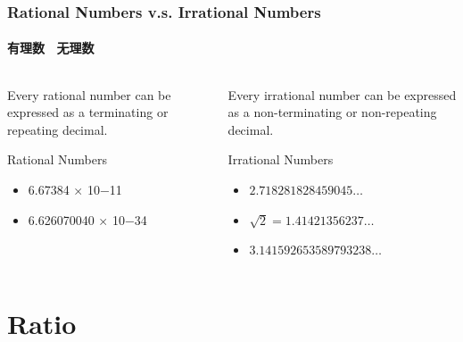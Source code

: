 \documentclass[
	11pt, %
]{beamer}
\begin{document}
\begin{frame}
\frametitle{Rational Numbers v.s. Irrational Numbers}
\framesubtitle{有理数 \ 无理数}

	  \begin{columns}[t] %
			\begin{column}{0.45\textwidth} %
							\begin{theorem}
								Every rational number can be expressed as a terminating or repeating decimal.
							\end{theorem}

						\begin{exampleblock}{Rational Numbers}
								\begin{itemize}
									\item 6.67384 × 10−11
									\item 6.626070040 × 10−34
								\end{itemize}							
						\end{exampleblock}
			\end{column}

			\begin{column}{0.5\textwidth} %
							\begin{theorem}
												Every irrational number can be expressed as a non-terminating or non-repeating decimal.
							\end{theorem}
			\begin{exampleblock}{Irrational Numbers}
								\begin{itemize}
									\item $2.718281828459045\ldots$
									\item $\sqrt{2} = 1.41421356237 \ldots$
									\item $3.141592653589793238 \ldots$
								\end{itemize}	
			\end{exampleblock}
			\end{column}
	\end{columns}
\end{frame}


\section{Ratio}
\end{document}
